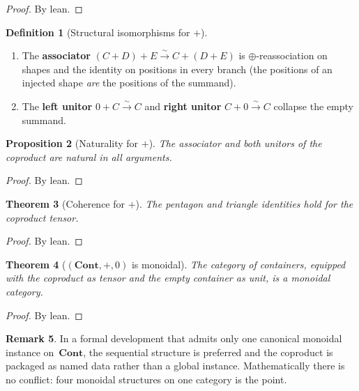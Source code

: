 \documentclass[11pt,a4paper]{article}
\theoremstyle{plain}
\newtheorem{theorem}{Theorem}[section]
\newtheorem{proposition}[theorem]{Proposition}
\theoremstyle{definition}
\newtheorem{definition}[theorem]{Definition}
\newtheorem{remark}[theorem]{Remark}
\newcommand{\Cont}{\mathbf{Cont}}
\begin{document}
\begin{proof}
By lean.
\end{proof}

\begin{definition}[Structural isomorphisms for $+$]\label{def:coprod-struct}
\begin{enumerate}
  \item The \textbf{associator}
        $(C+D)+E \xrightarrow{\sim} C+(D+E)$ is $\oplus$-reassociation
        on shapes and the identity on positions in every branch (the
        positions of an injected shape \emph{are} the positions of the
        summand).
  \item The \textbf{left unitor} $0 + C \xrightarrow{\sim} C$ and
        \textbf{right unitor} $C + 0 \xrightarrow{\sim} C$ collapse the
        empty summand.
\end{enumerate}
\end{definition}

\begin{proposition}[Naturality for $+$]\label{prop:coprod-nat}
The associator and both unitors of the coproduct are natural in all
arguments.
\end{proposition}

\begin{proof}
By lean.
\end{proof}

\begin{theorem}[Coherence for $+$]\label{thm:coprod-coherence}
The pentagon and triangle identities hold for the coproduct tensor.
\end{theorem}

\begin{proof}
By lean.
\end{proof}

\begin{theorem}[$(\Cont, +, 0)$ is monoidal]\label{thm:coprod-monoidal}
The category of containers, equipped with the coproduct as tensor and the
empty container as unit, is a monoidal category.
\end{theorem}

\begin{proof}
By lean.
\end{proof}

\begin{remark}
In a formal development that admits only one canonical monoidal instance
on~$\Cont$, the sequential structure is preferred and the coproduct is
packaged as named data rather than a global instance. Mathematically
there is no conflict: four monoidal structures on one category is the
point.
\end{remark}
\end{document}
